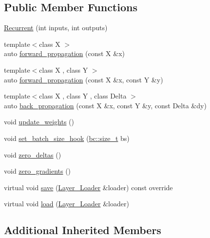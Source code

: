 \subsection*{Public Member Functions}
\begin{DoxyCompactItemize}
\item 
\hyperlink{structbc_1_1nn_1_1Recurrent_a0c8df4208c137ac0b1c940a80daf0c45}{Recurrent} (int inputs, int outputs)
\item 
{\footnotesize template$<$class X $>$ }\\auto \hyperlink{structbc_1_1nn_1_1Recurrent_ab01857476b3677586939ba2b39ab86d4}{forward\+\_\+propagation} (const X \&x)
\item 
{\footnotesize template$<$class X , class Y $>$ }\\auto \hyperlink{structbc_1_1nn_1_1Recurrent_a6e9e827f94aa6b84614d5b84774dbb97}{forward\+\_\+propagation} (const X \&x, const Y \&y)
\item 
{\footnotesize template$<$class X , class Y , class Delta $>$ }\\auto \hyperlink{structbc_1_1nn_1_1Recurrent_ac30d6edec8e456e06bc967acfc87f07e}{back\+\_\+propagation} (const X \&x, const Y \&y, const Delta \&dy)
\item 
void \hyperlink{structbc_1_1nn_1_1Recurrent_adcbd0a7b6f9306df5eed70afcb62ef56}{update\+\_\+weights} ()
\item 
void \hyperlink{structbc_1_1nn_1_1Recurrent_a073803232421cd777c05be0362030630}{set\+\_\+batch\+\_\+size\+\_\+hook} (\hyperlink{namespacebc_aaf8e3fbf99b04b1b57c4f80c6f55d3c5}{bc\+::size\+\_\+t} bs)
\item 
void \hyperlink{structbc_1_1nn_1_1Recurrent_a9be53cb4ab91cbcccb5f6ab855456b04}{zero\+\_\+deltas} ()
\item 
void \hyperlink{structbc_1_1nn_1_1Recurrent_ad1872c1a70b6fe5e576452b694c29153}{zero\+\_\+gradients} ()
\item 
virtual void \hyperlink{structbc_1_1nn_1_1Recurrent_aef30615b19b63bfc5d965a5799b7ad2c}{save} (\hyperlink{structbc_1_1nn_1_1Layer__Loader}{Layer\+\_\+\+Loader} \&loader) const override
\item 
virtual void \hyperlink{structbc_1_1nn_1_1Recurrent_aa2b86788ec2841005afb5209b7eb7282}{load} (\hyperlink{structbc_1_1nn_1_1Layer__Loader}{Layer\+\_\+\+Loader} \&loader)
\end{DoxyCompactItemize}
\subsection*{Additional Inherited Members}


